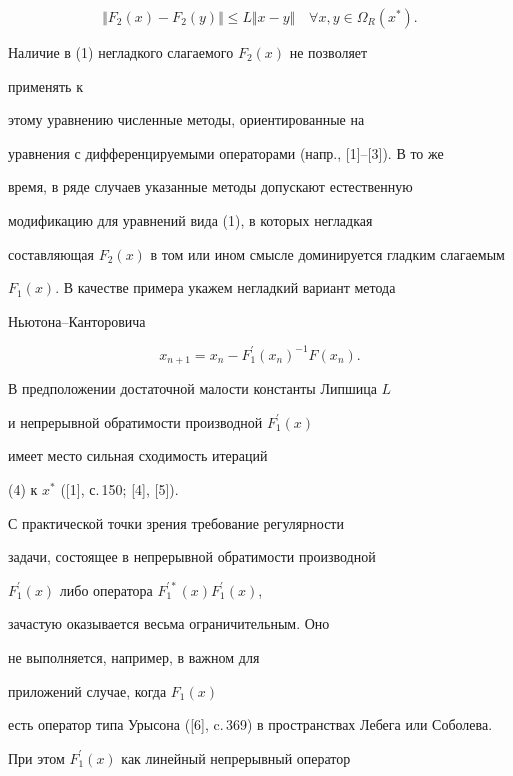 \begin{equation}


\Vert F_2 (x)- F_2 (y) \Vert \leq L \Vert x-y \Vert


\quad \forall x, y \in \Omega_R (x^*).


\end{equation}


Наличие в (1) негладкого слагаемого $F_2 (x)$ не позволяет


применять к


этому уравнению численные методы, ориентированные на


уравнения с дифференцируемыми операторами (напр., [1]--[3]). В то же


время, в ряде случаев указанные методы допускают естественную


модификацию для уравнений вида (1), в которых негладкая


составляющая $F_2 (x)$ в том или ином смысле доминируется гладким слагаемым


$F_1 (x)$. В качестве примера укажем негладкий вариант метода


Ньютона--Канторовича


\begin{equation}


x_{n+1}=x_n- F_1^{\prime}(x_n)^{-1} F(x_n).


\end{equation}


В предположении достаточной малости константы Липшица $L$


и непрерывной обратимости производной $F_1^{\prime}(x)$


имеет место сильная сходимость итераций


(4) к $x^*$ ([1], с.\,150; [4], [5]).


С практической точки зрения требование регулярности


задачи, состоящее в непрерывной обратимости производной


$F_1^{\prime}(x)$ либо оператора $F_1^{\prime *}(x) F_1^{\prime}(x)$,


зачастую оказывается весьма ограничительным. Оно


не выполняется, например, в важном для


приложений случае, когда $F_1 (x)$


есть оператор типа Урысона ([6], c.\,369) в пространствах Лебега или Соболева.


При этом $F_1^{\prime}(x)$ как линейный непрерывный оператор


